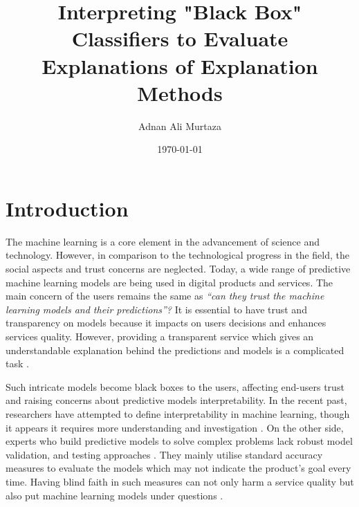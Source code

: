 \documentclass[english]{tktltiki2}
\title{Interpreting "Black Box" Classifiers to Evaluate Explanations of \newline
	 Explanation Methods}
\author{Adnan Ali Murtaza}
\date{\today}
\theoremstyle{definition}
\theoremstyle{remark}
\begin{document}

\frontmatter      %

\maketitle        %
\makeabstract     %

\tableofcontents  %

\mainmatter       %
\section{Introduction} %
The machine learning is a core element in the advancement of science and technology. However, in comparison to the technological progress in the field, the social aspects and trust concerns are neglected. Today, a wide range of predictive machine learning models are being used in digital products and services. The main concern of the users remains the same as \textit{“can they trust the machine learning models and their predictions”?} It is essential to have trust and transparency on models because it impacts on users decisions and enhances services quality. However, providing a transparent service which gives an understandable explanation behind the predictions and models is a complicated task \citep{lipton2016mythos, miller2018explanation, molnarinterpretable, gilpin2018explaining, murdoch2019interpretable}. 

Such intricate models become black boxes to the users, affecting end-users trust and raising concerns about predictive models interpretability. In the recent past, researchers have attempted to define interpretability in machine learning, though it appears it requires more understanding and investigation \citep{lipton2016mythos, miller2018explanation, molnarinterpretable}. On the other side, experts who build predictive models to solve complex problems lack robust model validation, and testing approaches \citep{murdoch2019interpretable, zhang2019machine}. They mainly utilise standard accuracy measures to evaluate the models which may not indicate the product’s goal every time.  Having blind faith in such measures can not only harm a service quality but also put machine learning models under questions \citep{miller2018explanation, molnarinterpretable}.
\end{document}
